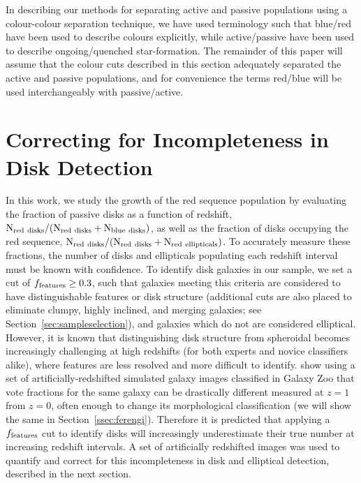 \documentclass[useAMS,usenatbib]{mn2e}
\begin{document}
In describing our methods for separating active and passive populations using a colour-colour separation technique, we have used terminology such that blue/red have been used to describe colours explicitly, while active/passive have been used to describe ongoing/quenched star-formation. The remainder of this paper will assume that the colour cuts described in this section adequately separated the active and passive populations, and for convenience the terms red/blue will be used interchangeably with passive/active.  

\section{Correcting for Incompleteness in Disk Detection}
\label{sec:correction}
In this work, we study the growth of the red sequence population by evaluating the fraction of passive disks as a function of redshift, $\rm N_{red~disks}/(N_{red~disks}+N_{blue~disks})$, as well as the fraction of disks occupying the red sequence, $\rm N_{red~disks}/(N_{red~disks}+N_{red~ellipticals})$. To accurately measure these fractions, the number of disks and ellipticals populating each redshift interval must be known with confidence. To identify disk galaxies in our sample, we set a cut of $f_{\rm features}\ge0.3$, such that galaxies meeting this criteria are considered to have distinguishable features or disk structure (additional cuts are also placed to eliminate clumpy, highly inclined, and merging galaxies; see Section~\ref{sec:sampleselection}), and galaxies which do not are considered elliptical. However, it is known that distinguishing disk structure from spheroidal becomes increasingly challenging at high redshifts (for both experts and novice classifiers alike), where features are less resolved and more difficult to identify. \citet{Willett2016} show using a set of artificially-redshifted simulated galaxy images classified in Galaxy Zoo that vote fractions for the same galaxy can be drastically different measured at $z=1$ from $z=0$, often enough to change its morphological classification (we will show the same in Section~\ref{ssec:ferengi}).  Therefore it is predicted that applying a $f_{\rm features}$ cut to identify disks will increasingly underestimate their true number at increasing redshift intervals. A set of artificially redshifted images was used to quantify and correct for this incompleteness in disk and elliptical detection, described in the next section.
 
\end{document}
